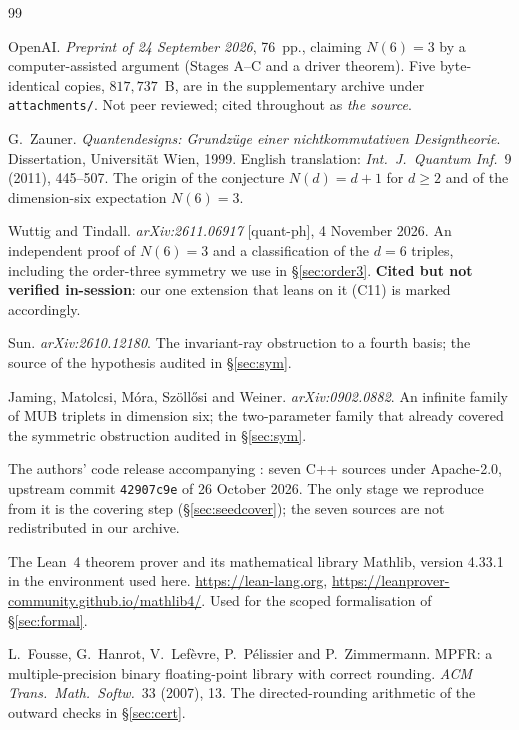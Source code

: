 \documentclass[10pt]{article}
\theoremstyle{definition}
\newcommand{\file}[1]{\texttt{\small #1}}
\begin{document}
\begin{thebibliography}{99}\small
\setlength{\itemsep}{1pt}

OpenAI. \emph{Preprint of 24 September 2026}, 76~pp., claiming $N(6)=3$ by a computer-assisted
argument (Stages A--C and a driver theorem). Five byte-identical copies, $817{,}737$~B, are in the
supplementary archive under \file{attachments/}. Not peer reviewed; cited throughout as \emph{the
source}.

G.~Zauner. \emph{Quantendesigns: Grundz\"uge einer nichtkommutativen Designtheorie}. Dissertation,
Universit\"at Wien, 1999. English translation: \emph{Int.\ J.\ Quantum Inf.}\ 9 (2011), 445--507.
The origin of the conjecture $N(d)=d+1$ for $d\ge2$ and of the dimension-six expectation $N(6)=3$.

Wuttig and Tindall. \emph{arXiv:2611.06917} [quant-ph], 4 November 2026. An independent proof of
$N(6)=3$ and a classification of the $d=6$ triples, including the order-three symmetry we use in
\S\ref{sec:order3}. \textbf{Cited but not verified in-session}: our one extension that leans on it
(C11) is marked accordingly.

Sun. \emph{arXiv:2610.12180}. The invariant-ray obstruction to a fourth basis; the source of the
hypothesis audited in \S\ref{sec:sym}.

Jaming, Matolcsi, M\'ora, Sz\"oll\H{o}si and Weiner. \emph{arXiv:0902.0882}. An infinite family of
MUB triplets in dimension six; the two-parameter family that already covered the symmetric
obstruction audited in \S\ref{sec:sym}.

The authors' code release accompanying \cite{ope26}: seven C++ sources under Apache-2.0, upstream
commit \texttt{42907c9e} of 26 October 2026. The only stage we reproduce from it is the covering
step (\S\ref{sec:seedcover}); the seven sources are not redistributed in our archive.

The Lean~4 theorem prover and its mathematical library Mathlib, version 4.33.1 in the environment
used here. \url{https://lean-lang.org}, \url{https://leanprover-community.github.io/mathlib4/}.
Used for the scoped formalisation of \S\ref{sec:formal}.

L.~Fousse, G.~Hanrot, V.~Lef\`evre, P.~P\'elissier and P.~Zimmermann. MPFR: a multiple-precision
binary floating-point library with correct rounding. \emph{ACM Trans.\ Math.\ Softw.}\ 33 (2007),
13. The directed-rounding arithmetic of the outward checks in \S\ref{sec:cert}.


\end{thebibliography}
\end{document}
